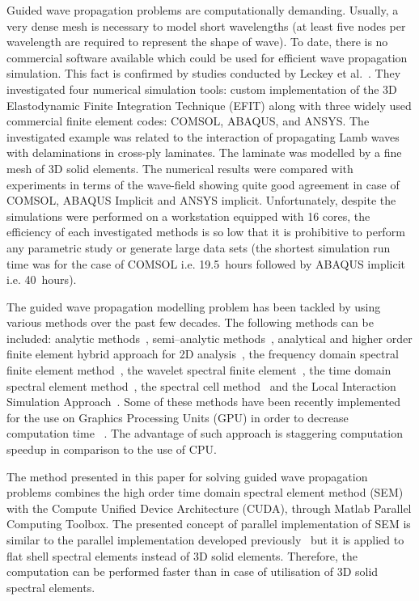\documentclass[runningheads]{llncs}
\newcommand{\etal}{et al.}
\begin{document}
Guided wave propagation problems are computationally demanding.
Usually, a very dense mesh is necessary to model short wavelengths (at least five nodes per wavelength are required to represent the shape of wave).
To date, there is no commercial software available which could be used for efficient wave propagation simulation. 
This fact is confirmed by studies conducted by Leckey \etal~\cite{Leckey2018}. 
They investigated four numerical simulation tools: custom implementation of the 3D Elastodynamic Finite Integration Technique (EFIT) \cite{Schubert1998} along with three widely used commercial finite element codes: COMSOL, ABAQUS, and ANSYS. 
The investigated example was related to the interaction of propagating Lamb waves with delaminations in cross-ply laminates. 
The laminate was modelled by a fine mesh of 3D solid elements. 
The numerical results were compared with experiments in terms of the wave-field showing quite good agreement in case of COMSOL, ABAQUS Implicit and ANSYS implicit. 
Unfortunately, despite the simulations were performed on a workstation equipped with 16 cores, the efficiency of each investigated methods is so low that it is prohibitive to perform any parametric study or generate large data sets (the shortest simulation run time was for the case of COMSOL i.e. 19.5~hours followed by ABAQUS implicit i.e. 40~hours).

The guided wave propagation modelling problem has been tackled by using various methods over the past few decades. 
The following methods can be included: analytic methods~\cite{Giurgiutiu2014}, semi--analytic methods~\cite{Bartoli2006,Gravenkamp2014},  analytical and higher order finite element hybrid approach for 2D analysis~\cite{Vivar-Perez2014}, the frequency domain spectral finite element method~\cite{Doyle1989,RoyMahapatra2003},  the wavelet spectral finite element~\cite{Mitra2008,Yang2016}, the time domain spectral element method~\cite{Lonkar2013,Ostachowicz2012,Schulte2010}, the spectral cell method~\cite{Duczek2014} and  the Local Interaction Simulation Approach~\cite{Kijanka2013}.
Some of these methods have been recently implemented for the use on Graphics Processing Units (GPU) in order to decrease computation time ~\cite{Kijanka2013,Kudela2016,Mossaiby2019,Shen2017}.
The advantage of such approach is staggering computation speedup in comparison to the use of CPU.

The method presented in this paper for solving guided wave propagation problems combines the high order time domain spectral element method (SEM) with the Compute Unified Device Architecture (CUDA),  through Matlab Parallel Computing Toolbox. 
The presented concept of parallel implementation of SEM is similar to the parallel implementation developed previously~\cite{Kudela2016} but it is applied to flat shell spectral elements instead of 3D solid elements. 
Therefore, the computation can be performed faster than in case of utilisation of 3D solid spectral elements. 
\end{document}
